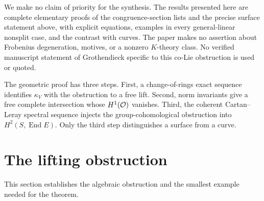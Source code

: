 \documentclass[11pt]{article}
\DeclareMathOperator{\End}{End}\DeclareMathOperator{\Hom}{Hom}
\theoremstyle{definition}\newtheorem{definition}[theorem]{Definition}
\theoremstyle{remark}\newtheorem{remark}[theorem]{Remark}
\begin{document}
We make no claim of priority for the synthesis. The results presented here are complete elementary proofs of the congruence-section lists and the precise surface statement above, with explicit equations, examples in every general-linear nonsplit case, and the contrast with curves. The paper makes no assertion about Frobenius degeneration, motives, or a nonzero $K$-theory class. No verified manuscript statement of Grothendieck specific to this co-Lie obstruction is used or quoted.

The geometric proof has three steps. First, a change-of-rings exact sequence identifies $\kappa_V$ with the obstruction to a free lift. Second, norm invariants give a free complete intersection whose $H^1(\mathcal O)$ vanishes. Third, the coherent Cartan--Leray spectral sequence injects the group-cohomological obstruction into $H^2(S,\End E)$. Only the third step distinguishes a surface from a curve.

\section{The lifting obstruction}

This section establishes the algebraic obstruction and the smallest example needed for the theorem.
\end{document}

